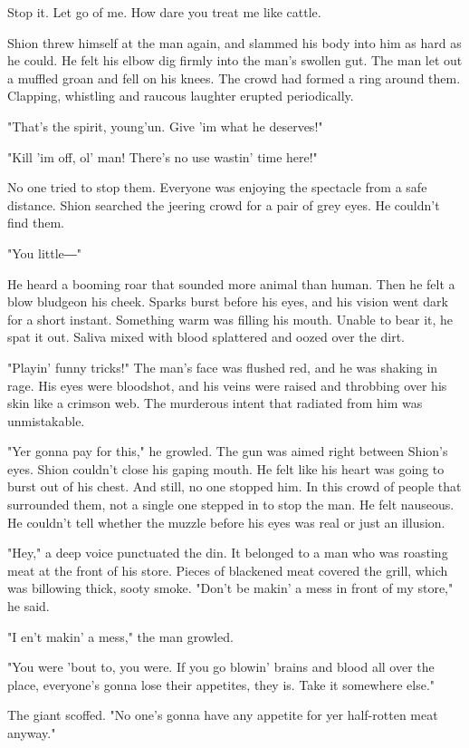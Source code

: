 Stop it. Let go of me. How dare you treat me like cattle.

Shion threw himself at the man again, and slammed his body into him as
hard as he could. He felt his elbow dig firmly into the man's swollen
gut. The man let out a muffled groan and fell on his knees. The crowd
had formed a ring around them. Clapping, whistling and raucous laughter
erupted periodically.

"That's the spirit, young'un. Give 'im what he deserves!"

"Kill 'im off, ol' man! There's no use wastin' time here!"

No one tried to stop them. Everyone was enjoying the spectacle from a
safe distance. Shion searched the jeering crowd for a pair of grey eyes.
He couldn't find them.

"You little―"

He heard a booming roar that sounded more animal than human. Then he
felt a blow bludgeon his cheek. Sparks burst before his eyes, and his
vision went dark for a short instant. Something warm was filling his
mouth. Unable to bear it, he spat it out. Saliva mixed with blood
splattered and oozed over the dirt.

"Playin' funny tricks!" The man's face was flushed red, and he was
shaking in rage. His eyes were bloodshot, and his veins were raised and
throbbing over his skin like a crimson web. The murderous intent that
radiated from him was unmistakable.

"Yer gonna pay for this," he growled. The gun was aimed right between
Shion's eyes. Shion couldn't close his gaping mouth. He felt like his
heart was going to burst out of his chest. And still, no one stopped
him. In this crowd of people that surrounded them, not a single one
stepped in to stop the man. He felt nauseous. He couldn't tell whether
the muzzle before his eyes was real or just an illusion.

"Hey," a deep voice punctuated the din. It belonged to a man who was
roasting meat at the front of his store. Pieces of blackened meat
covered the grill, which was billowing thick, sooty smoke. "Don't be
makin' a mess in front of my store," he said.

"I en't makin' a mess," the man growled.

"You were 'bout to, you were. If you go blowin' brains and blood all
over the place, everyone's gonna lose their appetites, they is. Take it
somewhere else."

The giant scoffed. "No one's gonna have any appetite for yer half-rotten
meat anyway."

